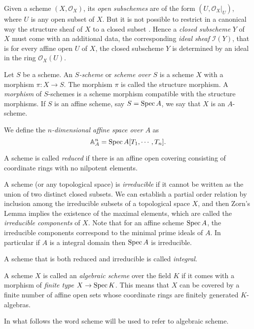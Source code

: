 \documentclass[a4paper,openany]{scrbook}
\begin{document}
Given a scheme $(X,\mathcal O_X)$, its \emph{open subschemes} are of the form $(U,\mathcal O_X|_U)$, where $U$ is any open subset of $X$. But it is not possible to restrict in a canonical way the structure sheaf of $X$ to a closed subset . Hence a \emph{closed subscheme} $Y$ of $X$ must come with an additional data, the corresponding \emph{ideal sheaf} $\mathcal I(Y)$, that is for every affine open $U$ of $X$, the closed subscheme $Y$ is determined by an ideal in the ring $\mathcal O_X(U)$.

\begin{defn}
 Let $S$ be a scheme. An \emph{$S$-scheme} or \emph{scheme over $S$} is a scheme $X$ with a morphism $\pi:X\to S$. The morphism $\pi$ is called the structure morphism. A \emph{morphism} of $S$-schemes is a scheme morphism compatible with the structure morphisms. If $S$ is an affine scheme, say $S=\operatorname{Spec} A$, we say that $X$ is an $A$-scheme. 
\end{defn}

\begin{example}
 We define the \emph{$n$-dimensional affine space over $A$} as
 \[
 \mathbb A^n_A = \operatorname{Spec} A[T_1,\cdots,T_n].
 \]
\end{example}

A scheme is called \emph{reduced} if there is an affine open covering consisting of coordinate rings with no nilpotent elements.

A scheme (or any topological space) is \emph{irreducible} if it cannot be written as the union of two distinct closed subsets. We can establish a partial order relation by inclusion among the irreducible subsets of a topological space $X$, and then Zorn's Lemma implies the existence of the maximal elements, which are called the \emph{irreducible components} of $X$. Note that for an affine scheme $\operatorname{Spec} A$, the irreducible components correspond to the minimal prime ideals of $A$. In particular if $A$ is a integral domain then $\operatorname{Spec} A$ is irreducible.

A scheme that is both reduced and irreducible is called \emph{integral}.

A scheme $X$ is called an \emph{algebraic scheme} over the field $K$ if it comes with a morphism of \emph{finite type} $X \to \operatorname{Spec} K$. This means that $X$ can be covered by a finite number of affine open sets whose coordinate rings are finitely generated $K$-algebras.

In what follows the word scheme will be used to refer to algebraic scheme.
\end{document}
